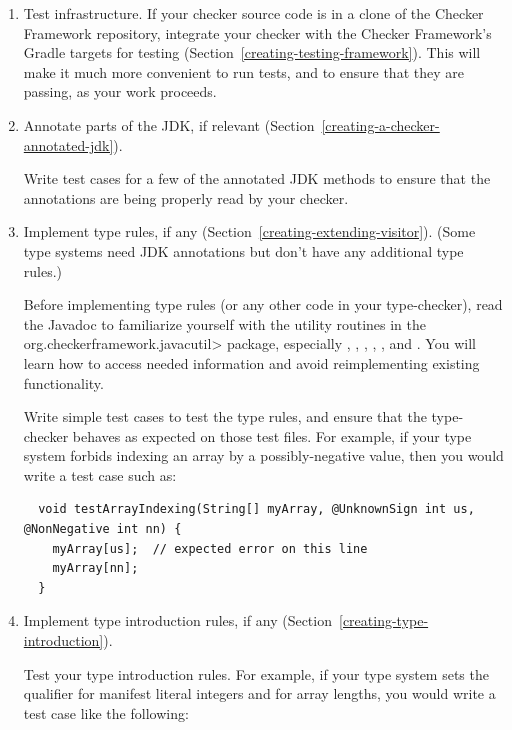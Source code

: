 \begin{enumerate}
\item
  Test infrastructure.
  If your checker source code is in a clone of the Checker Framework
  repository, integrate your checker with the Checker Framework's Gradle
  targets for testing (Section~\ref{creating-testing-framework}).  This
  will make it much more convenient to run tests, and to ensure that they
  are passing, as your work proceeds.

\item
  Annotate parts of the JDK, if relevant
  (Section~\ref{creating-a-checker-annotated-jdk}).

  Write test cases for a few of the annotated JDK methods to ensure
  that the annotations are being properly read by your checker.

\item
  Implement type rules, if any (Section~\ref{creating-extending-visitor}).
  (Some type systems need JDK annotations but don't have any additional
  type rules.)

  Before implementing type rules (or any other code in your type-checker),
  read the Javadoc to familiarize yourself with the utility routines in the
  \<org.checkerframework.javacutil> package, especially
  ,
  ,
  ,
  ,
  , and
  .
  You will learn how to access needed information and avoid
  reimplementing existing functionality.

  Write simple test cases to test the type rules, and ensure that the
  type-checker behaves as expected on those test files.
  For example, if your type system forbids indexing an array by a
  possibly-negative value, then you would write a test case such as:

\begin{Verbatim}
  void testArrayIndexing(String[] myArray, @UnknownSign int us, @NonNegative int nn) {
    myArray[us];  // expected error on this line
    myArray[nn];
  }
\end{Verbatim}

\item
  Implement type introduction rules, if any (Section~\ref{creating-type-introduction}).

  Test your type introduction rules.
  For example, if your type system sets the qualifier for manifest literal
  integers and for array lengths, you would write a test case like the following:


\end{enumerate}
